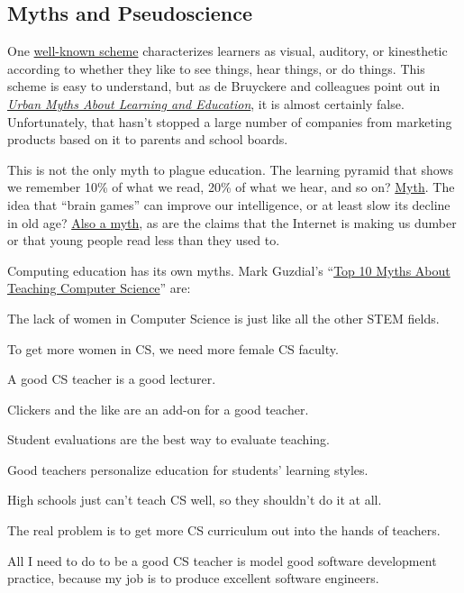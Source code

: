 \subsection{Myths and Pseudoscience}\label{myths-and-pseudoscience}

One
\href{https://en.wikipedia.org/wiki/Learning\_styles\#Learning\_modalities}{well-known
scheme} characterizes learners as visual, auditory, or kinesthetic
according to whether they like to see things, hear things, or do things.
This scheme is easy to understand, but as de Bruyckere and colleagues
point out in
\emph{\href{https://www.amazon.com/Urban-Myths-about-Learning-Education/dp/0128015373/}{Urban
Myths About Learning and Education}}, it is almost certainly false.
Unfortunately, that hasn't stopped a large number of companies from
marketing products based on it to parents and school boards.

This is not the only myth to plague education. The learning pyramid that
shows we remember 10\% of what we read, 20\% of what we hear, and so on?
\href{https://www.amazon.com/Urban-Myths-about-Learning-Education/dp/0128015373/}{Myth}.
The idea that ``brain games'' can improve our intelligence, or at least
slow its decline in old age?
\href{https://www.amazon.com/Urban-Myths-about-Learning-Education/dp/0128015373/}{Also
a myth}, as are the claims that the Internet is making us dumber or that
young people read less than they used to.

Computing education has its own myths. Mark Guzdial's
``\href{\{\{\%20page.root\%20\}\}/files/papers/guzdial-10-myths-2015.pdf}{Top
10 Myths About Teaching Computer Science}'' are:

The lack of women in Computer Science is just like all the other STEM
fields.

To get more women in CS, we need more female CS faculty.

A good CS teacher is a good lecturer.

Clickers and the like are an add-on for a good teacher.

Student evaluations are the best way to evaluate teaching.

Good teachers personalize education for students' learning styles.

High schools just can't teach CS well, so they shouldn't do it at all.

The real problem is to get more CS curriculum out into the hands of
teachers.

All I need to do to be a good CS teacher is model good software
development practice, because my job is to produce excellent software
engineers.

